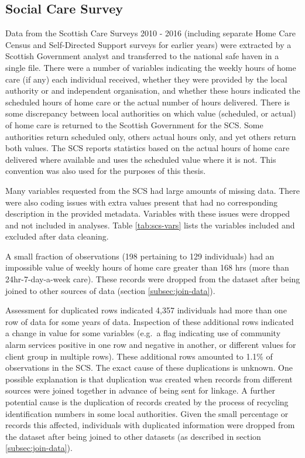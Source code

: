 \documentclass[]{article}
\begin{document}
\FloatBarrier

\subsection{Social Care Survey}\label{subsubsec:scs-summs}

Data from the Scottish Care Surveys 2010 - 2016 (including separate Home
Care Census and Self-Directed Support surveys for earlier years) were
extracted by a Scottish Government analyst and transferred to the
national safe haven in a single file. There were a number of variables
indicating the weekly hours of home care (if any) each individual
received, whether they were provided by the local authority or and
independent organisation, and whether these hours indicated the
scheduled hours of home care or the actual number of hours delivered.
There is some discrepancy between local authorities on which value
(scheduled, or actual) of home care is returned to the Scottish
Government for the SCS. Some authorities return scheduled only, others
actual hours only, and yet others return both values. The SCS reports
statistics based on the actual hours of home care delivered where
available and uses the scheduled value where it is not. This convention
was also used for the purposes of this thesis.

Many variables requested from the SCS had large amounts of missing data.
There were also coding issues with extra values present that had no
corresponding description in the provided metadata. Variables with these
issues were dropped and not included in analyses. Table
\ref{tab:scs-vars} lists the variables included and excluded after data
cleaning.

A small fraction of observations (198 pertaining to 129 individuals) had
an impossible value of weekly hours of home care greater than 168 hrs
(more than 24hr-7-day-a-week care). These records were dropped from the
dataset after being joined to other sources of data (section
\ref{subsec:join-data}).

Assessment for duplicated rows indicated 4,357 individuals had more than
one row of data for some years of data. Inspection of these additional
rows indicated a change in value for some variables (e.g.~a flag
indicating use of community alarm services positive in one row and
negative in another, or different values for client group in multiple
rows). These additional rows amounted to 1.1\% of observations in the
SCS. The exact cause of these duplications is unknown. One possible
explanation is that duplication was created when records from different
sources were joined together in advance of being sent for linkage. A
further potential cause is the duplication of records created by the
process of recycling identification numbers in some local authorities.
Given the small percentage or records this affected, individuals with
duplicated information were dropped from the dataset after being joined
to other datasets (as described in section \ref{subsec:join-data}).
\end{document}
